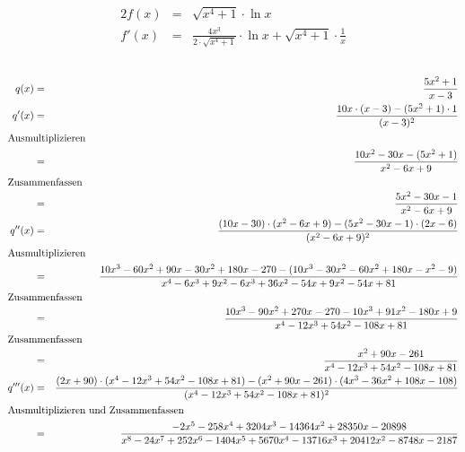 \documentclass[10pt,a4paper,oneside,ngerman,numbers=noenddot]{scrartcl}
\begin{document}
\subsubsection{} %
\begin{alignat*}{2}
f(x) &=& \sqrt{x^{4} + 1} \cdot \ln x \\
f'(x) &=& \frac{4x^{3}}{2 \cdot \sqrt{x^{4} + 1}} \cdot \ln x + \sqrt{x^{4} + 1} \cdot \frac{1}{x}
\end{alignat*}
\subsection{} %
\begin{alignat*}{2}
q(x) &=& \frac{5x^{2} + 1}{x - 3} \\
q'(x) &=& \frac{10x \cdot (x-3) - (5x^{2} + 1) \cdot 1}{(x-3)^{2}} \\
\intertext{Ausmultiplizieren}
&=& \frac{10x^{2} - 30x - (5x^{2} + 1)}{x^{2} - 6x + 9}\\
\intertext{Zusammenfassen}
&=& \frac{5x^{2} - 30x - 1}{x^{2} - 6x + 9}\\
q''(x) &=& \frac{(10x-30) \cdot (x^{2} - 6x + 9) - (5x^{2} - 30x - 1) \cdot (2x - 6)}{(x^{2} - 6x + 9)^{2}} \\
\intertext{Ausmultiplizieren}
&=& \frac{10x^{3} - 60x^{2} + 90x - 30x^{2} + 180x - 270 - (10x^{3} - 30x^{2} - 60x^{2} + 180x -x^{2} - 9)}{x^{4} - 6x^{3} + 9x^{2} - 6x^{3} + 36x^{2} - 54x + 9x^{2} - 54x + 81} \\
\intertext{Zusammenfassen}
&=& \frac{10x^{3} - 90x^{2} + 270x - 270 -10x^{3} + 91x^{2} - 180x + 9}{x^{4} - 12x^{3} + 54x^{2} - 108x + 81} \\
\intertext{Zusammenfassen}
&=& \frac{x^{2} + 90x - 261}{x^{4} - 12x^{3} + 54x^{2} - 108x + 81} \\
q'''(x) &=& \frac{(2x + 90) \cdot (x^{4} - 12x^{3} + 54x^{2} - 108x + 81) - (x^{2} + 90x - 261) \cdot (4x^{3} - 36x^{2} + 108x - 108)}{(x^{4} - 12x^{3} + 54x^{2} - 108x + 81)^{2}} \\
\intertext{Ausmultiplizieren und Zusammenfassen}
&=& \frac{-2x^{5} - 258x^{4} + 3204x^{3} - 14364x^{2} +28350x - 20898}{x^{8} - 24x^{7} + 252x^{6} -1404x^{5} +5670x^{4} - 13716x^{3} + 20412x^{2} -8748x - 2187}
\end{alignat*}
\end{document}
